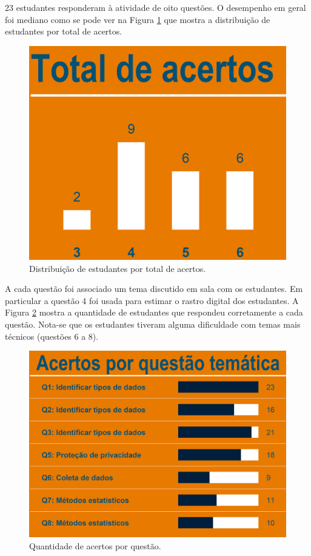 \documentclass[
]{book}
\begin{document}
23 estudantes responderam à atividade de oito questões. O desempenho em geral foi mediano como se pode ver na Figura \ref{fig:impacto19} que mostra a distribuição de estudantes por total de acertos.

\begin{figure}

{\centering \includegraphics[width=0.75\linewidth,height=0.75\textheight]{images/Impactos/19} 

}

\caption{Distribuição de estudantes por total de acertos.}\label{fig:impacto19}
\end{figure}

A cada questão foi associado um tema discutido em sala com os estudantes. Em particular a questão 4 foi usada para estimar o rastro digital dos estudantes. A Figura \ref{fig:impacto20} mostra a quantidade de estudantes que respondeu corretamente a cada questão. Nota-se que os estudantes tiveram alguma dificuldade com temas mais técnicos (questões 6 a 8).

\begin{figure}

{\centering \includegraphics[width=0.75\linewidth,height=0.75\textheight]{images/Impactos/20} 

}

\caption{Quantidade de acertos por questão.}\label{fig:impacto20}
\end{figure}
\end{document}
